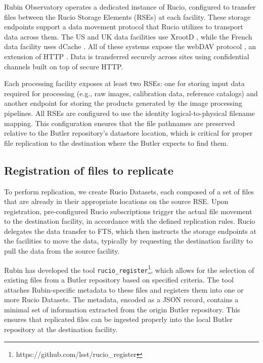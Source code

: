 \documentclass{webofc}
\begin{document}
Rubin Observatory operates a dedicated instance of Rucio, configured to transfer files between the Rucio Storage Elements (RSEs) at each facility. These storage endpoints support a data movement protocol that Rucio utilizes to transport data across them. The US and UK data facilities use XrootD \cite{xrootd}, while the French data facility uses dCache \cite{dCache}. All of these systems expose the webDAV protocol \cite{webdav}, an extension of HTTP \cite{http1.1}. Data is transferred securely across sites using confidential channels built on top of secure HTTP.

Each processing facility exposes at least two RSEs: one for storing input data required for processing (e.g., raw images, calibration data, reference catalogs) and another endpoint for storing the products generated by the image processing pipelines. All RSEs are configured to use the identity logical-to-physical filename mapping. This configuration ensures that the file pathnames are preserved relative to the Butler repository's datastore location, which is critical for proper file replication to the destination where the Butler expects to find them.

\subsection{Registration of files to replicate}
\label{registration}

To perform replication, we create Rucio Datasets, each composed of a set of files that are already in their appropriate locations on the source RSE. Upon registration, pre-configured Rucio subscriptions trigger the actual file movement to the destination facility, in accordance with the defined replication rules. Rucio delegates the data transfer to FTS, which then instructs the storage endpoints at the facilities to move the data, typically by requesting the destination facility to pull the data from the source facility.

Rubin has developed the tool \texttt{rucio\_register}\footnote{https://github.com/lsst/rucio\_register}, which allows for the selection of existing files from a Butler repository based on specified criteria. The tool attaches Rubin-specific metadata to these files and registers them into one or more Rucio Datasets. The metadata, encoded as a JSON record, contains a minimal set of information extracted from the origin Butler repository. This ensures that replicated files can be ingested properly into the local Butler repository at the destination facility.
\end{document}

